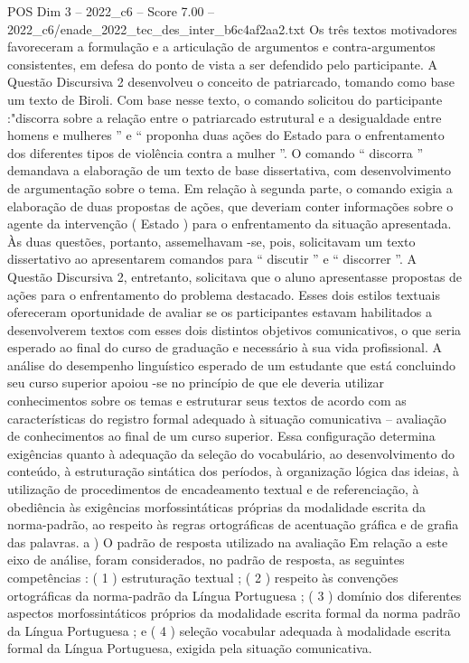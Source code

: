 \begin{textsample}{POS Dim 3 – 2022\_c6 – Score 7.00 – 2022\_c6/enade\_2022\_tec\_des\_inter\_b6c4af2aa2.txt}
Os três textos motivadores favoreceram a formulação e a articulação de argumentos e contra-argumentos consistentes, em defesa do ponto de vista a ser defendido pelo participante.
A Questão Discursiva 2 desenvolveu o conceito de patriarcado, tomando como base um texto de Biroli.
Com base nesse texto, o comando solicitou do participante :"discorra sobre a relação entre o patriarcado estrutural e a desigualdade entre homens e mulheres ” e “ proponha duas ações do Estado para o enfrentamento dos diferentes tipos de violência contra a mulher ”.
O comando “ discorra ” demandava a elaboração de um texto de base dissertativa, com desenvolvimento de argumentação sobre o tema.
Em relação à segunda parte, o comando exigia a elaboração de duas propostas de ações, que deveriam conter informações sobre o agente da intervenção ( Estado ) para o enfrentamento da situação apresentada.
Às duas questões, portanto, assemelhavam -se, pois, solicitavam um texto dissertativo ao apresentarem comandos para “ discutir ” e “ discorrer ”.
A Questão Discursiva 2, entretanto, solicitava que o aluno apresentasse propostas de ações para o enfrentamento do problema destacado.
Esses dois estilos textuais ofereceram oportunidade de avaliar se os participantes estavam habilitados a desenvolverem textos com esses dois distintos objetivos comunicativos, o que seria esperado ao final do curso de graduação e necessário à sua vida profissional.
A análise do desempenho linguístico esperado de um estudante que está concluindo seu curso superior apoiou -se no princípio de que ele deveria utilizar conhecimentos sobre os temas e estruturar seus textos de acordo com as características do registro formal adequado à situação comunicativa – avaliação de conhecimentos ao final de um curso superior.
Essa configuração determina exigências quanto à adequação da seleção do vocabulário, ao desenvolvimento do conteúdo, à estruturação sintática dos períodos, à organização lógica das ideias, à utilização de procedimentos de encadeamento textual e de referenciação, à obediência às exigências morfossintáticas próprias da modalidade escrita da norma-padrão, ao respeito às regras ortográficas de acentuação gráfica e de grafia das palavras. a ) O padrão de resposta utilizado na avaliação Em relação a este eixo de análise, foram considerados, no padrão de resposta, as seguintes competências : ( 1 ) estruturação textual ; ( 2 ) respeito às convenções ortográficas da norma-padrão da Língua Portuguesa ; ( 3 ) domínio dos diferentes aspectos morfossintáticos próprios da modalidade escrita formal da norma padrão da Língua Portuguesa ; e ( 4 ) seleção vocabular adequada à modalidade escrita formal da Língua Portuguesa, exigida pela situação comunicativa.

\end{textsample}
